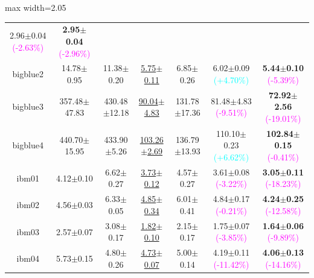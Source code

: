 \documentclass{article}
\theoremstyle{plain}
\theoremstyle{definition}
\theoremstyle{remark}
\begin{document}
\begin{table}[!htb]
\begin{center}
\begin{small}
\begin{adjustbox}{max width=2.05\columnwidth}
\begin{tabular}{cccc|ccc}
2.96$\pm$0.04 \textcolor{magenta}{\scriptsize{(-2.63\%)}} & \textbf{2.95$\pm$0.04} \textcolor{magenta}{\scriptsize{(-2.96\%)}}\\
bigblue2   & 14.78$\pm$0.95 & 11.38$\pm$0.20 & \underline{5.75$\pm$0.11} & 6.85$\pm$0.26  &
6.02$\pm$0.09  \textcolor{cyan}{\scriptsize{(+4.70\%)}}& \textbf{5.44$\pm$0.10} \textcolor{magenta}{\scriptsize{(-5.39\%)}}\\
bigblue3   & 357.48$\pm$47.83 & 430.48$\pm$12.18 & \underline{90.04$\pm$4.83} & 131.78$\pm$17.36 &
81.48$\pm$4.83 \textcolor{magenta}{\scriptsize{(-9.51\%)}} & \textbf{72.92$\pm$2.56} \textcolor{magenta}{\scriptsize{(-19.01\%)}}\\
bigblue4   & 440.70$\pm$15.95 & 433.90$\pm$5.26 & \underline{103.26$\pm$2.69} & 136.79$\pm$13.93 &
110.10$\pm$0.23 \textcolor{cyan}{\scriptsize{(+6.62\%)}} & \textbf{102.84$\pm$0.15} \textcolor{magenta}{\scriptsize{(-0.41\%)}}\\
ibm01   & 4.12$\pm$0.10 & 6.62$\pm$0.27 & \underline{3.73$\pm$0.12} & 4.57$\pm$0.27 &
3.61$\pm$0.08 \textcolor{magenta}{\scriptsize{(-3.22\%)}} & \textbf{3.05$\pm$0.11} \textcolor{magenta}{\scriptsize{(-18.23\%)}}\\
ibm02   & 4.56$\pm$0.03 & 6.33$\pm$0.05 & \underline{4.85$\pm$0.34} & 6.01$\pm$0.41 &
4.84$\pm$0.17 \textcolor{magenta}{\scriptsize{(-0.21\%)}} & \textbf{4.24$\pm$0.25} \textcolor{magenta}{\scriptsize{(-12.58\%)}}\\
ibm03   & 2.57$\pm$0.07 & 3.08$\pm$0.17 & \underline{1.82$\pm$0.10} & 2.15$\pm$0.17 &
1.75$\pm$0.07 \textcolor{magenta}{\scriptsize{(-3.85\%)}} & \textbf{1.64$\pm$0.06} \textcolor{magenta}{\scriptsize{(-9.89\%)}}\\
ibm04   & 5.73$\pm$0.15 & 4.80$\pm$0.26 & \underline{4.73$\pm$0.07} & 5.00$\pm$0.14 &
4.19$\pm$0.11 \textcolor{magenta}{\scriptsize{(-11.42\%)}} & \textbf{4.06$\pm$0.13} \textcolor{magenta}{\scriptsize{(-14.16\%)}}\\
\bottomrule
\end{tabular}
\end{adjustbox}

\end{small}

\end{center}
\end{table}
\end{document}

